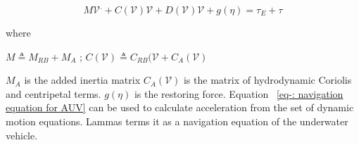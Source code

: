\documentclass[12pt]{dalcsthesis}
\begin{document}
\begin{equation}
\label{eq:vehicle hydrodynamics}
M\mathcal{{V}}^{.}+C(\mathcal{V})\mathcal{V}+D(\mathcal{V})\mathcal{V}+g(\eta)=\tau_{E}+\tau%
\end{equation}

where 

$M \triangleq M_{RB} + M_{A}$ ; $C(\mathcal{V}) \triangleq C_{RB}(\mathcal{V} + C_{A}(\mathcal{V})$

$M_A$ is the added inertia  matrix $C_{A}(\mathcal{V})$ is the matrix of hydrodynamic Coriolis and centripetal terms. $g(\eta)$ is the restoring force.
Equation ~\ref{eq-: navigation equation for AUV} can be used to calculate acceleration from the set of dynamic motion equations. Lammas \cite{Lammas2004} terms it as a navigation equation of the underwater vehicle.   
\end{document}
